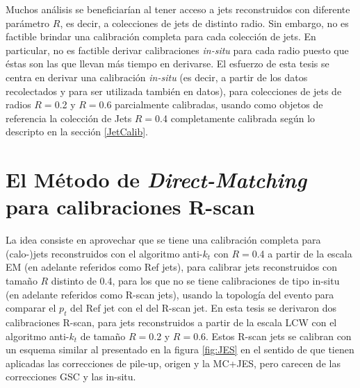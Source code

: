 Muchos análisis se beneficiarían al tener acceso a jets reconstruidos con diferente parámetro $R$, es decir, a colecciones de jets de distinto radio. Sin embargo, no es factible brindar una calibración completa para cada colección de jets. En particular, no es factible derivar calibraciones \textit{in-situ} para cada radio puesto que éstas son las que llevan más tiempo en derivarse. El esfuerzo de esta tesis se centra en derivar una calibración \textit{in-situ} (es decir, a partir de los datos recolectados y para ser utilizada también en datos), para colecciones de jets de radios $R=$0.2 y $R=$0.6 parcialmente calibradas, usando como objetos de referencia la colección de Jets $R=$0.4 completamente calibrada según lo descripto en la sección \ref{JetCalib}.   


\section{El Método de \textit{Direct-Matching} para calibraciones R-scan}\label{Rscan}





La idea consiste en aprovechar que se tiene una calibración completa para (calo-)jets reconstruidos con el algoritmo anti-$k_t$ con $R=$0.4 a partir de la escala EM \cite{JESpaper} (en adelante referidos como Ref jets), para calibrar jets reconstruidos con tamaño $R$ distinto de 0.4, para los que no se tiene calibraciones de tipo in-situ (en adelante referidos como R-scan jets), usando la topología del evento para comparar el $p_t$ del Ref jet con el del R-scan jet. En esta tesis se derivaron dos calibraciones R-scan, para jets reconstruidos a partir de la escala LCW con el algoritmo anti-$k_t$ de tamaño $R=$0.2 y $R=$0.6. Estos R-scan jets se calibran con un esquema similar al presentado en la figura \ref{fig:JES} en el sentido de que tienen aplicadas las correcciones de pile-up, origen y la MC+JES, pero carecen de las correcciones GSC y las in-situ.\\  


